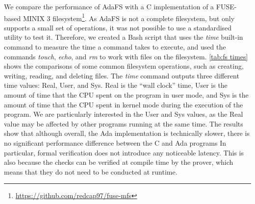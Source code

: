 We compare the performance of AdaFS with a C implementation of a FUSE-based MINIX 3 filesystem\footnote{\url{https://github.com/redcap97/fuse-mfs}}.
As AdaFS is not a complete filesystem, but only supports a small set of operations, it was not possible to use a standardised utility to test it.
Therefore, we created a Bash script that uses the \textit{time} built-in command to measure the time a command takes to execute, and used the commands \textit{touch}, \textit{echo}, and \textit{rm} to work with files on the filesystem.
\autoref{tab:fs times} shows the comparisons of some common filesystem operations, such as creating, writing, reading, and deleting files.
The \textit{time} command outputs three different time values: Real, User, and Sys.
Real is the ``wall clock'' time, User is the amount of time that the CPU spent on the program in user mode, and Sys is the amount of time that the CPU spent in kernel mode during the execution of the program.
We are particularly interested in the User and Sys values, as the Real value may be affected by other programs running at the same time.
The results show that although overall, the Ada implementation is technically slower, there is no significant performance difference between the C and Ada programs
In particular, formal verification does not introduce any noticeable latency.
This is also because the checks can be verified at compile time by the prover, which means that they do not need to be conducted at runtime.


